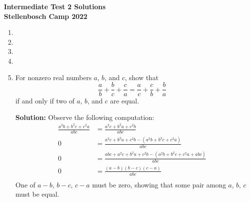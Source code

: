 \documentclass{article}
\begin{document}
\thispagestyle{empty}

\begin{center}
  \textbf{Intermediate Test 2 Solutions}
  \\ \vspace{1em}
  \textbf{\large Stellenbosch Camp 2022}
\end{center}


\begin{enumerate}[itemsep=24pt]

\item %

\item


\item 


\item 


\item
For nonzero real numbers $a$, $b$, and $c$, show that
\[ \frac{a}{b} +\frac{b}{c} +\frac{c}{a} = \frac{a}{c} +\frac{c}{b} +\frac{b}{a} \]
if and only if two of $a$, $b$, and $c$ are equal.

\textbf{Solution:} Observe the following computation:
\begin{align*}
\frac{a^{2}b + b^{2}c + c^{2}a}{abc} & = \frac{a^{2}c + b^{2}a + c^{2}b}{abc}\\
 0 & = \frac{a^{2}c + b^{2}a + c^{2}b -(a^{2}b + b^{2}c + c^{2}a)}{abc} \\
 0 & = \frac{abc + a^{2}c + b^{2}a + c^{2}b - (a^{2}b + b^{2}c + c^{2}a+abc)}{abc} \\
 0 & = \frac{(a-b)(b-c)(c-a)}{abc} \\
\end{align*}
One of $a-b$, $b-c$, $c-a$ must be zero, showing that some pair among $a$, $b$, $c$ must be equal.

\end{enumerate}
\end{document}
